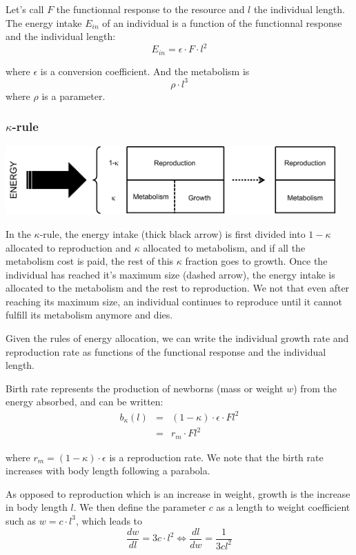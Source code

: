 
Let's call $F$ the functionnal response to the resource and $l$
the individual length. The energy intake $E_{in}$ of an individual
is a function of the functionnal response and the individual length:
\[
E_{in}=\epsilon\cdot F\cdot l^{2}
\]


where $\epsilon$ is a conversion coefficient. And the metabolism
is 
\[
\rho\cdot l^{3}
\]
 where $\rho$ is a parameter. 


\subsubsection*{$\kappa$-rule}

\includegraphics[width=0.95\textwidth]{4_ChapThe1/Fig/KRule}

In the $\kappa$-rule, the energy intake (thick black arrow) is first
divided into $1-\kappa$ allocated to reproduction and $\kappa$ allocated
to metabolism, and if all the metabolism cost is paid, the rest of
this $\kappa$ fraction goes to growth. Once the individual has reached
it's maximum size (dashed arrow), the energy intake is allocated to
the metabolism and the rest to reproduction. We not that even after
reaching its maximum size, an individual continues to reproduce until
it cannot fulfill its metabolism anymore and dies.

Given the rules of energy allocation, we can write the individual
growth rate and reproduction rate as functions of the functional response
and the individual length.

Birth rate represents the production of newborns (mass or weight $w$)
from the energy absorbed, and can be written:
\begin{eqnarray*}
b_{\kappa}(l) & = & (1-\kappa)\cdot\epsilon\cdot Fl^{2}\\
 & = & r_{m}\cdot Fl^{2}
\end{eqnarray*}


where $r_{m}=(1-\kappa)\cdot\epsilon$ is a reproduction rate. We
note that the birth rate increases with body length following a parabola. 

As opposed to reproduction which is an increase in weight, growth
is the increase in body length $l$. We then define the parameter
$c$ as a length to weight coefficient such as $w=c\cdot l^{3}$,
which leads to 
\[
\frac{dw}{dl}=3c\cdot l^{2}\Leftrightarrow\frac{dl}{dw}=\frac{1}{3cl^{2}}
\]


